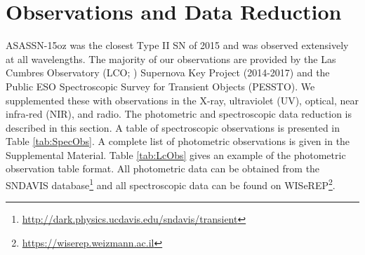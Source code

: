 \documentclass[a4paper,fleqn,usenatbib]{mnras}
\begin{document}
\section{Observations and Data Reduction}  \label{sec:Obs}
ASASSN-15oz was the closest Type II SN of 2015 and was observed extensively at all wavelengths. 
The majority of our observations are provided by the Las Cumbres Observatory (LCO; \citealt{2013brown}) Supernova Key Project (2014-2017) and the Public ESO Spectroscopic Survey for Transient Objects (PESSTO). 
We supplemented these with observations in the X-ray, ultraviolet (UV), optical, near infra-red (NIR), and radio. 
The photometric and spectroscopic data reduction is described in this section. 
A table of spectroscopic observations is presented in Table \ref{tab:SpecObs}.
A complete list of photometric observations is given in the Supplemental Material. 
Table \ref{tab:LcObs} gives an example of the photometric observation table format.  
All photometric data can be obtained from the SNDAVIS database\footnote{\hyperlink{http://dark.physics.ucdavis.edu/sndavis/transient}{http://dark.physics.ucdavis.edu/sndavis/transient}} and all spectroscopic data can be found on WISeREP\footnote{\hyperlink{https://wiserep.weizmann.ac.il}{https://wiserep.weizmann.ac.il}}.
\end{document}
